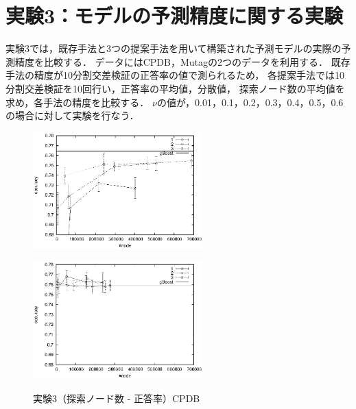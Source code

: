 \section{実験3：モデルの予測精度に関する実験}
実験3では，既存手法と3つの提案手法を用いて構築された予測モデルの実際の予測精度を比較する．
データにはCPDB，Mutagの2つのデータを利用する．
既存手法の精度が10分割交差検証の正答率の値で測られるため，
各提案手法では10分割交差検証を10回行い，正答率の平均値，分散値，
探索ノード数の平均値を求め，各手法の精度を比較する．
$\nu$の値が，0.01，0.1，0.2，0.3，0.4，0.5，0.6の場合に対して実験を行なう．
\begin{figure}[t]
	\begin{minipage}{0.5\hsize}
		\begin{center}
			\includegraphics[width=65mm]{cpdb/node_acc.eps}
		\end{center}
		\vspace{0.5cm}
		\label{fig:10}
	\end{minipage}
	\begin{minipage}{0.5\hsize}
		\begin{center}
			\includegraphics[width=65mm]{cpdb/node_acc_para.eps}
		\end{center}
		\vspace{0.5cm}
		\label{fig:11}
	\end{minipage}
	\caption{実験3（探索ノード数 - 正答率）CPDB}
	\label{cpdb_acc}
\end{figure}
